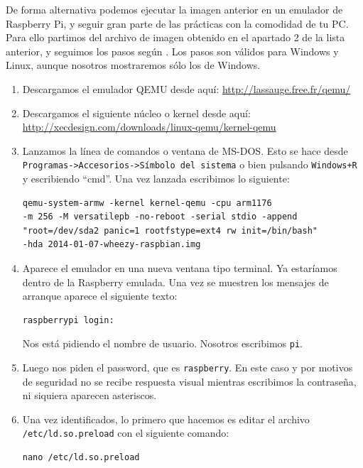 De forma alternativa podemos ejecutar la imagen anterior en un emulador de
Raspberry Pi, y seguir gran parte de las prácticas con la comodidad de tu PC. Para
ello partimos del archivo de imagen obtenido en el apartado 2 de la lista anterior,
y seguimos los pasos según \cite{QEMU}. Los pasos son válidos para Windows y Linux,
aunque nosotros mostraremos sólo los de Windows.

\begin{enumerate}
  \item Descargamos el emulador QEMU desde aquí: \newline
\hspace{2.5cm}
\textcolor{blue}{
  \href{http://lassauge.free.fr/qemu/}
  {http://lassauge.free.fr/qemu/}}
  \item Descargamos el siguiente núcleo o kernel desde aquí: \newline
\hspace{2.5cm}
\textcolor{blue}{
  \href{http://xecdesign.com/downloads/linux-qemu/kernel-qemu}
  {http://xecdesign.com/downloads/linux-qemu/kernel-qemu}}
  \item Lanzamos la línea de comandos o ventana de MS-DOS. Esto se hace desde
{\tt Programas->Accesorios->Símbolo del sistema} o bien pulsando {\tt Windows+R} y escribiendo
``cmd''. Una vez lanzada escribimos lo siguiente:
\begin{lstlisting}
qemu-system-armw -kernel kernel-qemu -cpu arm1176
-m 256 -M versatilepb -no-reboot -serial stdio -append
"root=/dev/sda2 panic=1 rootfstype=ext4 rw init=/bin/bash"
-hda 2014-01-07-wheezy-raspbian.img
\end{lstlisting}
  \item Aparece el emulador en una nueva ventana tipo terminal. Ya estaríamos
dentro de la Raspberry emulada. Una vez se muestren los mensajes de arranque
aparece el siguiente texto:
\begin{lstlisting}
raspberrypi login:
\end{lstlisting}
  Nos está pidiendo el nombre de usuario. Nosotros escribimos {\tt pi}.
  \item Luego nos piden el password, que es {\tt raspberry}. En este caso y
por motivos de seguridad no se recibe respuesta visual mientras escribimos
la contraseña, ni siquiera aparecen asteriscos.
  \item Una vez identificados, lo primero que hacemos es editar el archivo
{\tt /etc/ld.so.preload} con el siguiente comando:
\begin{lstlisting}
nano /etc/ld.so.preload

\end{lstlisting}
\end{enumerate}
